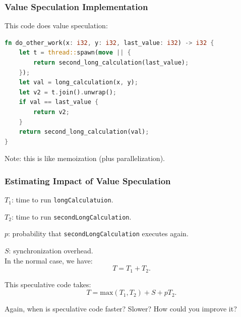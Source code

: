 \begin{frame}[fragile]
  \frametitle{Value Speculation Implementation}
  
  This code does value speculation:

\begin{lstlisting}[language=Rust]
fn do_other_work(x: i32, y: i32, last_value: i32) -> i32 {
    let t = thread::spawn(move || {
        return second_long_calculation(last_value);
    });
    let val = long_calculation(x, y);
    let v2 = t.join().unwrap();
    if val == last_value {
        return v2;
    }
    return second_long_calculation(val);
}
\end{lstlisting}


  Note: this is like memoization (plus parallelization).
  
\end{frame}

\begin{frame}
  \frametitle{Estimating Impact of Value Speculation}

  
  $T_1$: time to run {\tt longCalculatuion}.

  $T_2$: time to run {\tt secondLongCalculation}.

  $p$: probability that {\tt secondLongCalculation} executes again.

  $S$: synchronization overhead.\\[1em]

  In the normal case, we have:
    \[ T = T_1 +T_2.\]

  This speculative code takes:
    \[ T = \mbox{max}(T_1, T_2) + S + pT_2.\]

     Again, when is speculative code faster? Slower? How could you improve it?

  
\end{frame}

